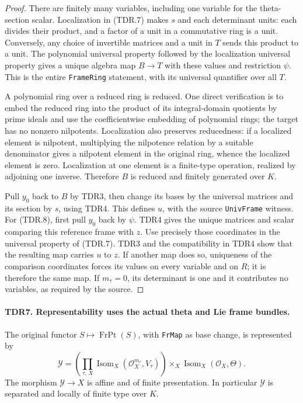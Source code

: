 \documentclass[11pt,a4paper]{article}
\numberwithin{equation}{section}
\theoremstyle{remark}\newtheorem{remark}[theorem]{Remark}
\begin{document}
\begin{proof}
There are finitely many variables, including one variable for the
theta-section scalar.  Localization in (TDR.7) makes \(s\) and
each determinant units: each divides their product, and a factor
of a unit in a commutative ring is a unit.  Conversely, any choice
of invertible matrices and a unit in \(T\) sends this product to
a unit.  The polynomial universal property followed by the
localization universal property gives a unique algebra map
\(B\to T\) with these values and restriction \(\psi\).
This is the entire \texttt{Frame\allowbreak Ring} statement, with its
universal quantifier over all \(T\).

A polynomial ring over a reduced ring is reduced.  One direct
verification is to embed the reduced ring into the product of
its integral-domain quotients by prime ideals and use the
coefficientwise embedding of polynomial rings; the target has no
nonzero nilpotents.  Localization also preserves reducedness:
if a localized element is nilpotent, multiplying the nilpotence
relation by a suitable denominator gives a nilpotent element in
the original ring, whence the localized element is zero.
Localization at one element is a finite-type operation, realized
by adjoining one inverse.  Therefore \(B\) is reduced and
finitely generated over \(K\).

Pull \(y_0\) back to \(B\) by TDR3, then change its bases by
the universal matrices and its section by \(s\), using TDR4.
This defines \(u\), with the source \texttt{Univ\allowbreak Frame} witness.
For (TDR.8), first pull \(y_0\) back by \(\psi\).  TDR4
gives the unique matrices and scalar comparing this reference
frame with \(z\).  Use precisely those coordinates in the
universal property of (TDR.7).  TDR3 and the compatibility in
TDR4 show that the resulting map carries \(u\) to \(z\).
If another map does so, uniqueness of the comparison coordinates
forces its values on every variable and on \(R\); it is therefore
the same map.  If \(m_\tau=0\), its determinant is one and it
contributes no variables, as required by the source.
\end{proof}

\paragraph{TDR7. Representability uses the actual theta and Lie frame bundles.}
\label{claim:TDR7}
The original functor \(S\mapsto\operatorname{FrPt}(S)\), with
\texttt{Fr\allowbreak Map} as base change, is represented by
\[
 \mathcal Y=
 \left(\prod_{\tau,\,X}
   \operatorname{Isom}_X(\mathcal O_X^{m_\tau},V_\tau)\right)
       \times_X\operatorname{Isom}_X(\mathcal O_X,\Theta).
                                                               \tag{TDR.9}
\]
The morphism \(\mathcal Y\to X\) is affine and of finite
presentation.  In particular \(\mathcal Y\) is separated and
locally of finite type over \(K\).
\end{document}
